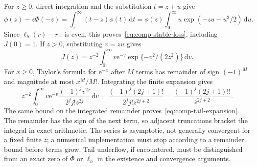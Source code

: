 For $z\ge0$, direct integration and the substitution $t=z+u$ give
\[
 \phi(z)-z\Phi(-z)=\int_z^\infty(t-z)\phi(t)\,\mathrm{d}t
   =\phi(z)\int_0^\infty u\exp(-zu-u^2/2)\,\mathrm{d}u.
\]
Since $\ell_h(r)-r_+$ is even, this proves~\eqref{eq:comp-stable-loss}, including $J(0)=1$. If $z>0$, substituting $v=zu$ gives
\[
 J(z)=z^{-2}\int_0^\infty v \mathrm{e}^{-v}
                          \exp\{-v^2/(2z^2)\}\,\mathrm{d}v.
\]
For $x\ge0$, Taylor's formula for $\mathrm{e}^{-x}$ after $M$ terms has remainder of sign $(-1)^M$ and magnitude at most $x^M/M!$. Integrating the finite expansion gives
\[
 z^{-2}\int_0^\infty v \mathrm{e}^{-v}\frac{(-1)^jv^{2j}}{2^j j!z^{2j}}\,\mathrm{d}v
 =\frac{(-1)^j(2j+1)!}{2^j j!z^{2j+2}}
 =\frac{(-1)^j(2j+1)!!}{z^{2j+2}}.
\]
The same bound on the integrated remainder proves~\eqref{eq:comp-tail-expansion}. The remainder has the sign of the next term, so adjacent truncations bracket the integral in exact arithmetic. The series is asymptotic, not generally convergent for a fixed finite $z$; a numerical implementation must stop according to a remainder bound before terms grow. Tail underflow, if encountered, must be distinguished from an exact zero of $\Phi$ or $\ell_h$ in the existence and convergence arguments.

